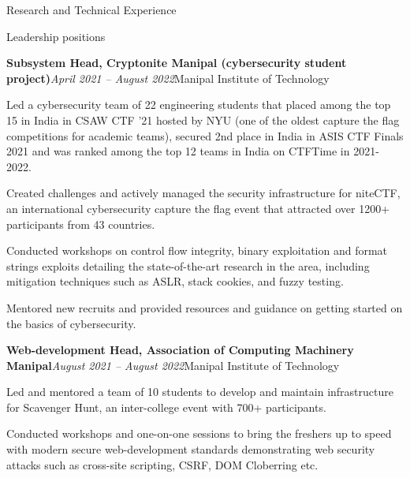 \documentclass{resume} %
\begin{document}
\begin{rSection}{Research and Technical Experience}
\begin{rSection}{Leadership positions}
\begin{rSubsection}{\bf Subsystem Head, Cryptonite Manipal (cybersecurity student project)}{\em April 2021 -- August 2022}{Manipal Institute of Technology}{}
\item Led a cybersecurity team of 22 engineering students that placed among the top 15 in India in CSAW CTF '21 hosted by NYU (one of the oldest capture the flag competitions for academic teams), secured 2nd place in India in ASIS CTF Finals 2021 and was ranked among the top 12 teams in India on CTFTime in 2021-2022.
\item Created challenges and actively managed the security infrastructure for niteCTF, an international cybersecurity capture the flag event that attracted over 1200+ participants from 43 countries.
\item Conducted workshops on control flow integrity, binary exploitation and format strings exploits detailing the state-of-the-art research in the area, including mitigation techniques such as ASLR, stack cookies, and fuzzy testing.
\item Mentored new recruits and provided resources and guidance on getting started on the basics of cybersecurity.
\end{rSubsection}
\end{rSection}
\begin{rSubsection}{\bf Web-development Head, Association of Computing Machinery Manipal}{\em August 2021 -- August 2022}{Manipal Institute of Technology}{}
\item Led and mentored a team of 10 students to develop and maintain infrastructure for Scavenger Hunt, an inter-college event with 700+ participants.
\item Conducted workshops and one-on-one sessions to bring the freshers up to speed with modern secure web-development standards demonstrating web security attacks such as cross-site scripting, CSRF, DOM Cloberring etc.
\end{rSubsection}
\end{rSection}
\end{document}
